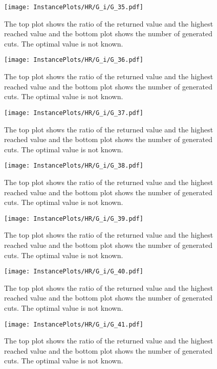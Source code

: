 \documentclass[10pt,a4paper]{article}
\begin{document}
\begin{figure}[H]
\texttt{[image: InstancePlots/HR/G\_i/G\_35.pdf]}
\caption{The top plot shows the ratio of the returned value and the highest reached value     and the bottom plot shows the number of generated cuts. The optimal value is not known.}
\end{figure}

\begin{figure}[H]
\texttt{[image: InstancePlots/HR/G\_i/G\_36.pdf]}
\caption{The top plot shows the ratio of the returned value and the highest reached value     and the bottom plot shows the number of generated cuts. The optimal value is not known.}
\end{figure}

\begin{figure}[H]
\texttt{[image: InstancePlots/HR/G\_i/G\_37.pdf]}
\caption{The top plot shows the ratio of the returned value and the highest reached value     and the bottom plot shows the number of generated cuts. The optimal value is not known.}
\end{figure}

\begin{figure}[H]
\texttt{[image: InstancePlots/HR/G\_i/G\_38.pdf]}
\caption{The top plot shows the ratio of the returned value and the highest reached value     and the bottom plot shows the number of generated cuts. The optimal value is not known.}
\end{figure}

\begin{figure}[H]
\texttt{[image: InstancePlots/HR/G\_i/G\_39.pdf]}
\caption{The top plot shows the ratio of the returned value and the highest reached value     and the bottom plot shows the number of generated cuts. The optimal value is not known.}
\end{figure}

\begin{figure}[H]
\texttt{[image: InstancePlots/HR/G\_i/G\_40.pdf]}
\caption{The top plot shows the ratio of the returned value and the highest reached value     and the bottom plot shows the number of generated cuts. The optimal value is not known.}
\end{figure}

\begin{figure}[H]
\texttt{[image: InstancePlots/HR/G\_i/G\_41.pdf]}
\caption{The top plot shows the ratio of the returned value and the highest reached value     and the bottom plot shows the number of generated cuts. The optimal value is not known.}
\end{figure}
\end{document}
